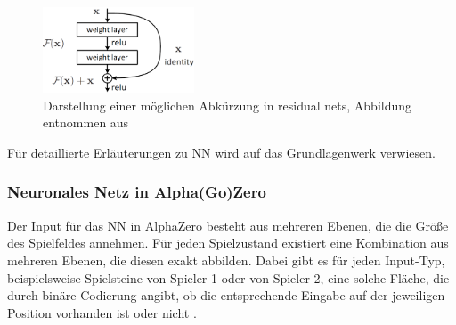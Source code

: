 \documentclass[12pt,a4paper]{article}
\begin{document}
\begin{figure}
\centering
\includegraphics[width=0.4\textwidth]{pics/res_skip_connection.png}	
\caption{Darstellung einer möglichen Abkürzung in residual nets, Abbildung entnommen aus \cite{He2016}}
\label{fig:res_skip}
\end{figure}

Für detaillierte Erläuterungen zu NN wird auf das Grundlagenwerk \cite{Goodfellow2015} verwiesen.

\subsubsection{Neuronales Netz in Alpha(Go)Zero}
\label{secNNAZ}
Der Input für das NN in AlphaZero besteht aus mehreren Ebenen, die die Größe des Spielfeldes annehmen. Für jeden Spielzustand existiert eine Kombination aus mehreren Ebenen, die diesen exakt abbilden. Dabei gibt es für jeden Input-Typ, beispielsweise Spielsteine von Spieler 1 oder von Spieler 2, eine solche Fläche, die durch binäre Codierung angibt, ob die entsprechende Eingabe auf der jeweiligen Position vorhanden ist oder nicht \cite{SilverHubert2017}.
\end{document}
